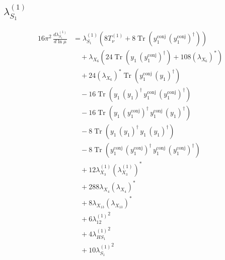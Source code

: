 \documentclass[10pt,a4paper]{article}
\begin{document}
\subsection*{$\lambda_{S_1}^{(1)}$}
\begin{align*}
16\pi^2\,\frac{d \lambda_{S_1}^{(1)}}{d\ln\mu} &={\lambda_{S_1}^{(1)}} (8 T_{\nu}^{(1)}+8 \operatorname{Tr}\!\left({y_{1}^{\mathrm{conj}}}\,\left({y_{1}^{\mathrm{conj}}}\right)^{\dagger}\right)) \\
&\quad +{\lambda_{X_{6}}} (24 \operatorname{Tr}\!\left({y_1}\,\left({y_{1}^{\mathrm{conj}}}\right)^{\dagger}\right)+108 \left({\lambda_{X_{6}}}\right)^{*}) \\
&\quad +24 \left({\lambda_{X_{6}}}\right)^{*} \operatorname{Tr}\!\left({y_{1}^{\mathrm{conj}}}\,\left({y_1}\right)^{\dagger}\right) \\
&\quad -16 \operatorname{Tr}\!\left({y_1}\,\left({y_1}\right)^{\dagger}\,{y_{1}^{\mathrm{conj}}}\,\left({y_{1}^{\mathrm{conj}}}\right)^{\dagger}\right) \\
&\quad -16 \operatorname{Tr}\!\left({y_1}\,\left({y_{1}^{\mathrm{conj}}}\right)^{\dagger}\,{y_{1}^{\mathrm{conj}}}\,\left({y_1}\right)^{\dagger}\right) \\
&\quad -8 \operatorname{Tr}\!\left({y_1}\,\left({y_1}\right)^{\dagger}\,{y_1}\,\left({y_1}\right)^{\dagger}\right) \\
&\quad -8 \operatorname{Tr}\!\left({y_{1}^{\mathrm{conj}}}\,\left({y_{1}^{\mathrm{conj}}}\right)^{\dagger}\,{y_{1}^{\mathrm{conj}}}\,\left({y_{1}^{\mathrm{conj}}}\right)^{\dagger}\right) \\
&\quad +12 {\lambda_{X_{3}}^{(1)}} \left({\lambda_{X_{3}}^{(1)}}\right)^{*} \\
&\quad +288 {\lambda_{X_{4}}} \left({\lambda_{X_{4}}}\right)^{*} \\
&\quad +8 {\lambda_{X_{13}}} \left({\lambda_{X_{13}}}\right)^{*} \\
&\quad +6 {\lambda_{12}^{(1)}}^2 \\
&\quad +4 {\lambda_{HS_1}^{(1)}}^2 \\
&\quad +10 {\lambda_{S_1}^{(1)}}^2 \\
\end{align*}
\end{document}

